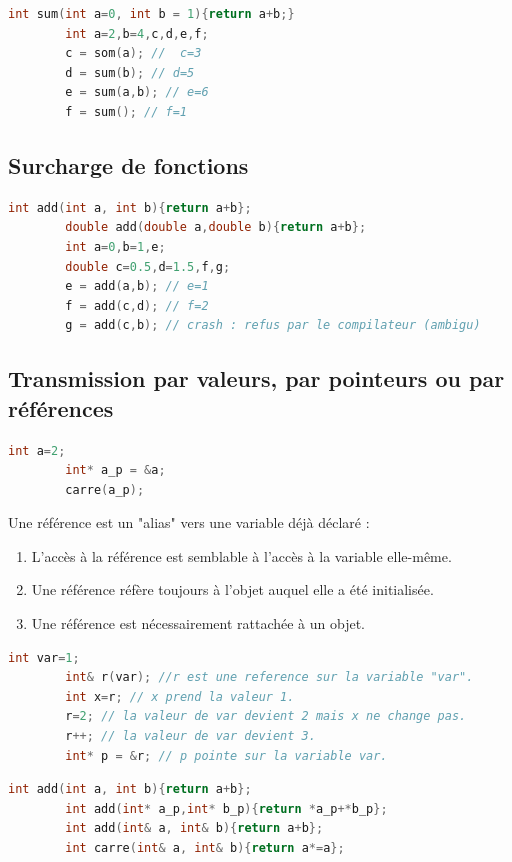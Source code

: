 \documentclass[12pt,a4paper]{article}
\begin{document}
	\begin{lstlisting}[language=C++,caption=Exemple 2]
		int sum(int a=0, int b = 1){return a+b;}
		int a=2,b=4,c,d,e,f;
		c = som(a); //  c=3
		d = sum(b); // d=5
		e = sum(a,b); // e=6
		f = sum(); // f=1
	\end{lstlisting}
	
	\subsection{Surcharge de fonctions}
	
	\begin{lstlisting}[language=C++,caption=Exemple de surcharge de fonctions]
		int add(int a, int b){return a+b};
		double add(double a,double b){return a+b};
		int a=0,b=1,e;
		double c=0.5,d=1.5,f,g;
		e = add(a,b); // e=1
		f = add(c,d); // f=2
		g = add(c,b); // crash : refus par le compilateur (ambigu)
	\end{lstlisting}
	
	\subsection{Transmission par valeurs, par pointeurs ou par références}
	
	\begin{lstlisting}[language=C++,caption=Transmission par pointeur]
		int a=2;
		int* a_p = &a;
		carre(a_p);
	\end{lstlisting}
	
	Une référence est un "alias" vers une variable déjà déclaré : 
	\begin{enumerate}[label=$\to$]
		\item L'accès à la référence est semblable à l'accès à la variable elle-même.
		\item Une référence réfère toujours à l'objet auquel elle a été initialisée.
		\item Une référence est nécessairement rattachée à un objet.
	\end{enumerate}
	
	\begin{lstlisting}[language=C++,caption=Exemple d'une référence]
		int var=1;
		int& r(var); //r est une reference sur la variable "var".
		int x=r; // x prend la valeur 1.
		r=2; // la valeur de var devient 2 mais x ne change pas.
		r++; // la valeur de var devient 3.
		int* p = &r; // p pointe sur la variable var.
	\end{lstlisting}
	\begin{lstlisting}[language=C++,caption=Transmission par référence]
		int add(int a, int b){return a+b};
		int add(int* a_p,int* b_p){return *a_p+*b_p};
		int add(int& a, int& b){return a+b};
		int carre(int& a, int& b){return a*=a};
	\end{lstlisting}
	
\end{document}
